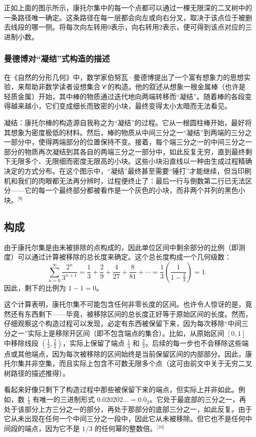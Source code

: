 正如上面的图示所示，康托尔集中的每一个点都可以通过一棵无限深的二叉树中的一条路径唯一确定。这条路径在每一层都会向左或向右分叉，取决于该点位于被删去线段的哪一侧。将每次向左转用0表示，向右转用2表示，便可得到该点对应的三进制小数。
\subsubsection{曼德博对“凝结”式构造的描述}
在《自然的分形几何》中，数学家伯努瓦·曼德博提出了一个富有想象力的思想实验，来帮助非数学读者设想集合 𝒞 的构造。他的叙述从想象一根金属棒（也许是轻质金属）开始，其中棒的物质通过迭代地向两端转移而“凝结”。随着棒的各段变得越来越小，它们变成细长而致密的小块，最终变得太小太暗而无法看见。

凝结：康托尔棒的构造源自我称之为“凝结”的过程。它从一根圆柱棒开始，最好将其想象为密度极低的材料。然后，棒的物质从中间三分之一“凝结”到两端的三分之一部分中，使得两端部分的位置保持不变。接着，每个端三分之一的中间三分之一部分的物质再次凝结到其各自的两端三分之一部分中，如此反复无穷，直到最终剩下无限多个、无限细而密度无限高的小块。这些小块沿直线以一种由生成过程精确决定的方式分布。在这个图示中，“凝结”最终甚至需要“锤打”才能继续，但当印刷机和我们的肉眼都无法再分辨时，过程便终止了：最后一行与倒数第二行已无法区分——它的每一个最终部分都被看作是一个灰色的小块，而非两个并列的黑色小块。\(^\text{[9]}\)
\subsection{构成}
由于康托尔集是由未被排除的点构成的，因此单位区间中剩余部分的比例（即测度）可以通过计算被移除的总长度来确定。这个总长度构成一个几何级数：
$$
\sum_{n=0}^{\infty} \frac{2^n}{3^{n+1}} = \frac{1}{3} + \frac{2}{9} + \frac{4}{27} + \frac{8}{81} + \cdots = \frac{1}{3} \left( \frac{1}{1 - \frac{2}{3}} \right) = 1.~
$$
因此，剩下的比例为 $1 - 1 = 0$。

这个计算表明，康托尔集不可能包含任何非零长度的区间。也许令人惊讶的是，竟然还有东西剩下——毕竟，被移除区间的总长度正好等于原始区间的长度。然而，仔细观察这个构造过程可以发现，必定有东西被保留下来，因为每次移除“中间三分之一”实际上是移除开区间（即不包含端点的集合）。比如，从原始区间 $[0, 1]$ 中移除线段 $(\frac{1}{3}, \frac{2}{3})$，实际上保留了端点 $\frac{1}{3}$ 和 $\frac{2}{3}$。后续的每一步也不会移除这些端点或其他端点，因为每次被移除的区间始终是当前保留区间的内部部分。因此，康托尔集并非空集，而且实际上包含不可数无限多个点（这可由前文中关于无穷二叉树路径的描述推得）。

看起来好像只剩下了构造过程中那些被保留下来的端点，但实际上并非如此。例如，数 $\frac{1}{4}$ 有唯一的三进制形式 $0.020202\ldots = 0.\overline{0}_2$。它处于最底部的三分之一，再处于该部分上方三分之一的部分，再处于那部分的底部三分之一，如此反复。由于它从未出现在任何一个中间三分之一段中，因此它从未被移除。但它也不是任何中间段的端点，因为它不是 $1/3$ 的任何幂的整数倍。\(^\text{[10]}\)

